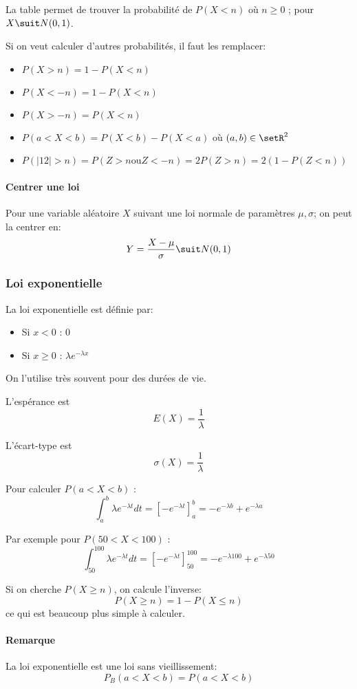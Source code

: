 \documentclass[10pt,a4paper,french]{article}
\begin{document}
La table permet de trouver la probabilité de $P(X < n)$ où $n \geq 0$ ; pour $X \suit N(0, 1)$.

Si on veut calculer d'autres probabilités, il faut les remplacer:
\begin{itemize}
\item $P(X > n) = 1 - P(X < n)$
\item $P(X < -n) = 1 - P(X < n)$
\item $P(X > -n) = P(X < n)$
\item $P(a < X < b) = P(X < b) - P(X < a)$ où $(a,b) \in \setR^2$
\item $P(\vert 12 \vert > n) = P(Z > n \text{ou} Z < -n) = 2 P(Z > n) = 2 (1-P(Z < n))$
\end{itemize}

\paragraph{Centrer une loi}
Pour une variable aléatoire $X$ suivant une loi normale de paramètres $\mu, \sigma$; on peut la centrer en: 
\[Y = \frac{X - \mu}{\sigma} \suit N(0, 1)\]

\subsubsection{Loi exponentielle}

La loi exponentielle est définie par:
\begin{itemize}
\item Si $x < 0$ : 0
\item Si $x \geq 0$ : $\lambda e^{-\lambda x}$
\end{itemize}

On l'utilise très souvent pour des durées de vie.

L'espérance est \[E(X) = \frac{1}{\lambda}\]

L'écart-type est \[ \sigma(X) = \frac{1}{\lambda} \]

Pour calculer $P(a < X < b)$ : \[ \int_a^b \lambda e^{-\lambda t} dt = \left[ -e^{-\lambda t} \right]_a^b = -e^{-\lambda b} + e^{-\lambda a} \]

Par exemple pour $P(50 < X < 100)$ : \[ \int_{50}^{100} \lambda e^{-\lambda t} dt = \left[ -e^{-\lambda t} \right]_{50}^{100} = -e^{-\lambda 100} + e^{-\lambda 50} \]

Si on cherche $P(X \geq n)$, on calcule l'inverse: \[ P(X \geq n) = 1 - P(X \leq n) \] ce qui est beaucoup plus simple à calculer.

\paragraph{Remarque}
La loi exponentielle est une loi sans vieillissement: \[ P_B(a < X < b) = P(a < X < b) \]
\end{document}
